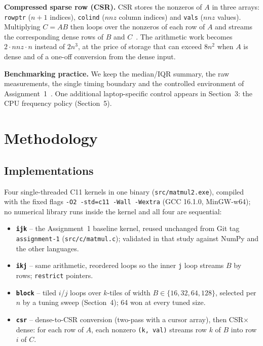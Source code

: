 \documentclass[11pt,a4paper]{article}
\begin{document}
\textbf{Compressed sparse row (CSR).} CSR stores the nonzeros of $A$ in three
arrays: \texttt{rowptr} ($n{+}1$ indices), \texttt{colind} ($nnz$ column indices)
and \texttt{vals} ($nnz$ values). Multiplying $C = AB$ then loops over the nonzeros
of each row of $A$ and streams the corresponding dense rows of $B$ and
$C$~\cite{saad2003}. The arithmetic work becomes $2 \cdot nnz \cdot n$ instead of
$2n^3$, at the price of storage that can exceed $8n^2$ when $A$ is dense and of a
one-off conversion from the dense input.

\textbf{Benchmarking practice.} We keep the median/IQR summary, the raw
measurements, the single timing boundary and the controlled environment of
Assignment~1~\cite{fleming1986,mytkowicz2009}. One additional laptop-specific
control appears in Section~3: the CPU frequency policy (Section~5).

\section{Methodology}

\subsection{Implementations}

Four single-threaded C11 kernels in one binary (\texttt{src/matmul2.exe}),
compiled with the fixed flags \texttt{-O2 -std=c11 -Wall -Wextra} (GCC 16.1.0,
MinGW-w64); no numerical library runs inside the kernel and all four are
sequential:

\begin{itemize}
  \item \textbf{\texttt{ijk}} -- the Assignment~1 baseline kernel, reused
        unchanged from Git tag \texttt{assignment-1}
        (\texttt{src/c/matmul.c}); validated in that study against NumPy and the
        other languages.
  \item \textbf{\texttt{ikj}} -- same arithmetic, reordered loops so the inner
        \texttt{j} loop streams $B$ by rows; \texttt{restrict} pointers.
  \item \textbf{\texttt{block}} -- tiled $i$/$j$ loops over $k$-tiles of width
        $B \in \{16,32,64,128\}$, selected per $n$ by a tuning sweep
        (Section~4); 64 won at every tuned size.
  \item \textbf{\texttt{csr}} -- dense-to-CSR conversion (two-pass with a cursor
        array), then CSR$\times$dense: for each row of $A$, each nonzero
        \texttt{(k, val)} streams row $k$ of $B$ into row $i$ of $C$.
\end{itemize}
\end{document}
